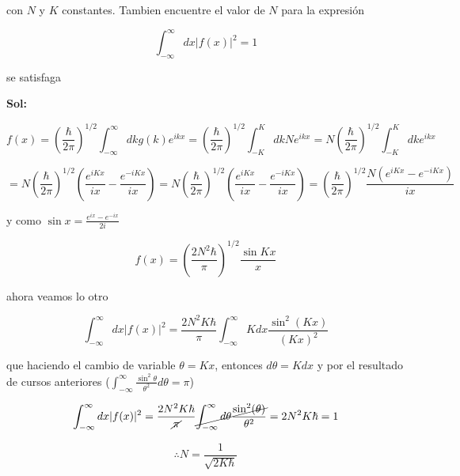 \documentclass[12pt,a4paper]{article}
\begin{document}
\begin{enumerate}
    con $N$ y $K$ constantes. Tambien encuentre el valor de $N$ para la expresión
    
    \begin{equation*}
        \int_{-\infty}^{\infty} dx |f(x)|^2 = 1
    \end{equation*}
    
    se satisfaga
    
    \textbf{Sol:}
    
    \begin{equation*}
    f(x) =\left(\frac{\hbar}{2\pi}\right)^{1/2} \int_{-\infty}^{\infty} dk g(k) e^{ikx}= \left(\frac{\hbar}{2\pi}\right)^{1/2} \int_{-K}^{K} dk N e^{ikx} = N\left(\frac{\hbar}{2\pi}\right)^{1/2} \int_{-K}^{K} dk  e^{ikx}
    \end{equation*}
    
    \begin{equation*}
        = N\left(\frac{\hbar}{2\pi}\right)^{1/2} \left(\frac{e^{iKx}}{ix} - \frac{e^{-iKx}}{ix}\right)=  N\left(\frac{\hbar}{2\pi}\right)^{1/2} \left(\frac{e^{iKx}}{ix} - \frac{e^{-iKx}}{ix}\right)= \left(\frac{\hbar}{2\pi}\right)^{1/2} \frac{N(e^{iKx}- e^{-iKx})}{ix}
    \end{equation*}
    
    y como $\sin{x} = \frac{e^{ix}- e^{-ix}}{2i}$
    
    \begin{equation*}
        f(x) = \left(\frac{2N^2 \hbar}{\pi}\right)^{1/2} \frac{\sin{Kx}}{x}
    \end{equation*}
    
    ahora veamos lo otro
    
    \begin{equation*}
        \int_{-\infty}^{\infty} dx |f(x)|^2 = \frac{2N^2 K \hbar}{\pi} \int_{-\infty}^{\infty} Kdx \frac{\sin^2(Kx)}{(Kx)^2} 
    \end{equation*}
    
    que haciendo el cambio de variable $\theta = Kx$, entonces $d \theta = Kdx$ y por el resultado de cursos anteriores ($\int_{-\infty}^{\infty} \frac{\sin^2{\theta}}{\theta^2} d\theta= \pi$)
    
    \begin{equation*}
        \int_{-\infty}^{\infty} dx |f(x)|^2 = \frac{2N^2 K \hbar}{\cancel{\pi}} \cancel{\int_{-\infty}^{\infty} d\theta \frac{\sin^2(\theta)}{\theta^2}}  = 2N^2K \hbar = 1
    \end{equation*}
    
    \begin{equation*}
        \therefore N= \frac{1}{\sqrt{2K \hbar}}
    \end{equation*}
    

\end{enumerate}
\end{document}
